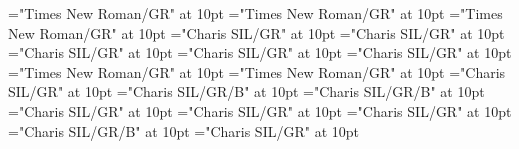 \documentclass[a4paper,twoside]{article}
\begin{document}
\font\translationLcpttranslationsexamplessensesensesentryletDatadicBody="Times New Roman/GR" at 10pt
\font\xitempttranslationLcpttranslationsexamplessensesensesentryletDatadicBody="Times New Roman/GR" at 10pt
\font\spanptxitempttranslationLcpttranslationsexamplessensesensesentryletDatadicBody="Times New Roman/GR" at 10pt
\font\spanentranslationLcpttranslationsexamplessensesensesentryletDatadicBody="Charis SIL/GR" at 10pt
\font\xitementranslationLcpttranslationsexamplessensesensesentryletDatadicBody="Charis SIL/GR" at 10pt
\font\spanenxitementranslationLcpttranslationsexamplessensesensesentryletDatadicBody="Charis SIL/GR" at 10pt
\font\complexformrefsentryletDatadicBody="Charis SIL/GR" at 10pt
\font\complexformtypecomplexformrefsentryletDatadicBody="Charis SIL/GR" at 10pt
\font\LexEntryTypepublishStemComplexFormTypeReverseAbbrPubptcomplexformtypecomplexformrefsentryletDatadicBody="Times New Roman/GR" at 10pt
\font\spanptLexEntryTypepublishStemComplexFormTypeReverseAbbrPubptcomplexformtypecomplexformrefsentryletDatadicBody="Times New Roman/GR" at 10pt
\font\spanencomplexformtypecomplexformrefsentryletDatadicBody="Charis SIL/GR" at 10pt
\font\complexformformsehcomplexformrefsentryletDatadicBody="Charis SIL/GR/B" at 10pt
\font\spanencomplexformformsehcomplexformrefsentryletDatadicBody="Charis SIL/GR/B" at 10pt
\font\spanencomplexformrefsentryletDatadicBody="Charis SIL/GR" at 10pt
\font\xitementryrefcomponentprimaryrefsentryletDatadicBody="Charis SIL/GR" at 10pt
\font\axitementryrefcomponentprimaryrefsentryletDatadicBody="Charis SIL/GR" at 10pt
\font\LexEntrypublishStemComponentTargetHeadWordRefsehaxitementryrefcomponentprimaryrefsentryletDatadicBody="Charis SIL/GR/B" at 10pt
\font\spanenentryrefcomponentprimaryrefsentryletDatadicBody="Charis SIL/GR" at 10pt
\font\translationLcentranslationsexamplessensesensesentryletDatadicBody
\end{document}

